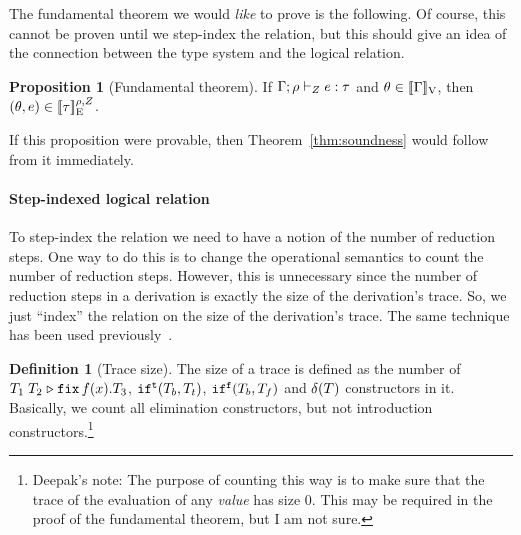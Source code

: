 \documentclass[a4paper,11pt]{article}
\theoremstyle{definition}
\newtheorem{prop}[thm]{Proposition}
\newtheorem{defn}[thm]{Definition}
\begin{document}
The fundamental theorem we would \emph{like} to prove is the
following. Of course, this cannot be proven until we step-index the
relation, but this should give an idea of the connection between the
type system and the logical relation.

\begin{prop}[Fundamental theorem]
\label{prop:fund}
  If $\Gamma; \rho \vdash_{Z} e: \tau$ and $ \theta \in
  [\![ \Gamma ]\!]_{\text{V}}$, then $(\theta, e) \in [\![ \tau ]\!]_{\text{E}}^{\rho, Z}$.
\end{prop}


If this proposition were provable, then Theorem~\ref{thm:soundness}
would follow from it immediately.

\paragraph{Step-indexed logical relation}
To step-index the relation we need to have a notion of the number of
reduction steps. One way to do this is to change the operational
semantics to count the number of reduction steps. However, this is
unnecessary since the number of reduction steps in a derivation is
exactly the size of the derivation's trace. So, we just ``index'' the
relation on the size of the derivation's trace. The same technique has
been used previously~\cite{cicek15}.

\begin{defn}[Trace size]
  The size of a trace is defined as the number of
  $T_1 \; T_2 \mathrel{\triangleright} {\mathop{\mathtt{fix}} f(x).T_3}$, $\mathtt{if}^{\mathtt{t}}(T_b, T_t)$,
  $\mathtt{if}^{\mathtt{f}}(T_b, T_f)$ and $\delta(T)$ constructors in
  it. Basically, we count all elimination constructors, but not
  introduction constructors.\footnote{Deepak's note: The purpose of
    counting this way is to make sure that the trace of the evaluation
    of any \emph{value} has size $0$. This may be required in the
    proof of the fundamental theorem, but I am not sure.}

\end{defn}
\end{document}
